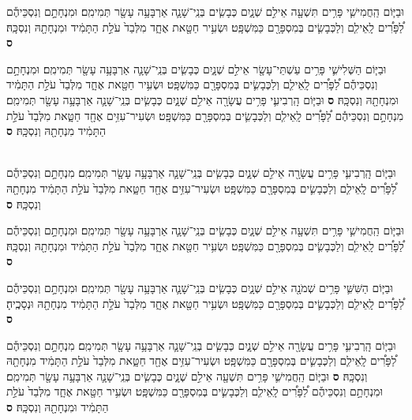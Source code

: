 \documentclass[twoside, openany, parskip=half, 11pt]{book}
\begin{document}
\begin{footnotesize}
\begin{multicols}{2}
וּבַיּ֧וֹם הַֽחֲמִישִׁ֛י פָּרִ֥ים תִּשְׁעָ֖ה אֵילִ֣ם שְׁנָ֑יִם כְּבָשִׂ֧ים בְּנֵֽי־שָׁנָ֛ה אַרְבָּעָ֥ה עָשָׂ֖ר תְּמִימִֽם׃ וּמִנְחָתָ֣ם וְנִסְכֵּיהֶ֡ם לַ֠פָּרִ֠ים לָֽאֵילִ֧ם וְלַכְּבָשִׂ֛ים בְּמִסְפָּרָ֖ם כַּמִּשְׁפָּֽט׃ וּשְׂעִ֥יר חַטָּ֖את אֶחָ֑ד מִלְּבַד֙ עֹלַ֣ת הַתָּמִ֔יד וּמִנְחָתָ֖הּ וְנִסְכָּֽהּ׃ \textbf{ס} 

וּבַיּ֧וֹם הַשְּׁלִישִׁ֛י פָּרִ֥ים עַשְׁתֵּי־עָשָׂ֖ר אֵילִ֣ם שְׁנָ֑יִם כְּבָשִׂ֧ים בְּנֵֽי־שָׁנָ֛ה אַרְבָּעָ֥ה עָשָׂ֖ר תְּמִימִֽם׃ וּמִנְחָתָ֣ם וְנִסְכֵּיהֶ֡ם לַ֠פָּרִ֠ים לָֽאֵילִ֧ם וְלַכְּבָשִׂ֛ים בְּמִסְפָּרָ֖ם כַּמִּשְׁפָּֽט׃ וּשְׂעִ֥יר חַטָּ֖את אֶחָ֑ד מִלְּבַד֙ עֹלַ֣ת הַתָּמִ֔יד וּמִנְחָתָ֖הּ וְנִסְכָּֽהּ׃ \textbf{ס} 
וּבַיּ֧וֹם הָֽרְבִיעִ֛י פָּרִ֥ים עֲשָׂרָ֖ה אֵילִ֣ם שְׁנָ֑יִם כְּבָשִׂ֧ים בְּנֵֽי־שָׁנָ֛ה אַרְבָּעָ֥ה עָשָׂ֖ר תְּמִימִֽם׃ מִנְחָתָ֣ם וְנִסְכֵּיהֶ֡ם לַ֠פָּרִ֠ים לָֽאֵילִ֧ם וְלַכְּבָשִׂ֛ים בְּמִסְפָּרָ֖ם כַּמִּשְׁפָּֽט׃ וּשְׂעִיר־עִזִּ֥ים אֶחָ֖ד חַטָּ֑את מִלְּבַד֙ עֹלַ֣ת הַתָּמִ֔יד מִנְחָתָ֖הּ וְנִסְכָּֽהּ׃ \textbf{ס} 

\\
וּבַיּ֧וֹם הָֽרְבִיעִ֛י פָּרִ֥ים עֲשָׂרָ֖ה אֵילִ֣ם שְׁנָ֑יִם כְּבָשִׂ֧ים בְּנֵֽי־שָׁנָ֛ה אַרְבָּעָ֥ה עָשָׂ֖ר תְּמִימִֽם׃ מִנְחָתָ֣ם וְנִסְכֵּיהֶ֡ם לַ֠פָּרִ֠ים לָֽאֵילִ֧ם וְלַכְּבָשִׂ֛ים בְּמִסְפָּרָ֖ם כַּמִּשְׁפָּֽט׃ וּשְׂעִיר־עִזִּ֥ים אֶחָ֖ד חַטָּ֑את מִלְּבַד֙ עֹלַ֣ת הַתָּמִ֔יד מִנְחָתָ֖הּ וְנִסְכָּֽהּ׃ \textbf{ס} 

וּבַיּ֧וֹם הַֽחֲמִישִׁ֛י פָּרִ֥ים תִּשְׁעָ֖ה אֵילִ֣ם שְׁנָ֑יִם כְּבָשִׂ֧ים בְּנֵֽי־שָׁנָ֛ה אַרְבָּעָ֥ה עָשָׂ֖ר תְּמִימִֽם׃ וּמִנְחָתָ֣ם וְנִסְכֵּיהֶ֡ם לַ֠פָּרִ֠ים לָֽאֵילִ֧ם וְלַכְּבָשִׂ֛ים בְּמִסְפָּרָ֖ם כַּמִּשְׁפָּֽט׃ וּשְׂעִ֥יר חַטָּ֖את אֶחָ֑ד מִלְּבַד֙ עֹלַ֣ת הַתָּמִ֔יד וּמִנְחָתָ֖הּ וְנִסְכָּֽהּ׃ \textbf{ס} 

וּבַיּ֧וֹם הַשִּׁשִּׁ֛י פָּרִ֥ים שְׁמֹנָ֖ה אֵילִ֣ם שְׁנָ֑יִם כְּבָשִׂ֧ים בְּנֵֽי־שָׁנָ֛ה אַרְבָּעָ֥ה עָשָׂ֖ר תְּמִימִֽם׃ וּמִנְחָתָ֣ם וְנִסְכֵּיהֶ֡ם לַ֠פָּרִ֠ים לָֽאֵילִ֧ם וְלַכְּבָשִׂ֛ים בְּמִסְפָּרָ֖ם כַּמִּשְׁפָּֽט׃ וּשְׂעִ֥יר חַטָּ֖את אֶחָ֑ד מִלְּבַד֙ עֹלַ֣ת הַתָּמִ֔יד מִנְחָתָ֖הּ וּנְסָכֶֽיהָ׃ \textbf{ס} 

וּבַיּ֧וֹם הָֽרְבִיעִ֛י פָּרִ֥ים עֲשָׂרָ֖ה אֵילִ֣ם שְׁנָ֑יִם כְּבָשִׂ֧ים בְּנֵֽי־שָׁנָ֛ה אַרְבָּעָ֥ה עָשָׂ֖ר תְּמִימִֽם׃ מִנְחָתָ֣ם וְנִסְכֵּיהֶ֡ם לַ֠פָּרִ֠ים לָֽאֵילִ֧ם וְלַכְּבָשִׂ֛ים בְּמִסְפָּרָ֖ם כַּמִּשְׁפָּֽט׃ וּשְׂעִיר־עִזִּ֥ים אֶחָ֖ד חַטָּ֑את מִלְּבַד֙ עֹלַ֣ת הַתָּמִ֔יד מִנְחָתָ֖הּ וְנִסְכָּֽהּ׃ \textbf{ס} 
וּבַיּ֧וֹם הַֽחֲמִישִׁ֛י פָּרִ֥ים תִּשְׁעָ֖ה אֵילִ֣ם שְׁנָ֑יִם כְּבָשִׂ֧ים בְּנֵֽי־שָׁנָ֛ה אַרְבָּעָ֥ה עָשָׂ֖ר תְּמִימִֽם׃ וּמִנְחָתָ֣ם וְנִסְכֵּיהֶ֡ם לַ֠פָּרִ֠ים לָֽאֵילִ֧ם וְלַכְּבָשִׂ֛ים בְּמִסְפָּרָ֖ם כַּמִּשְׁפָּֽט׃ וּשְׂעִ֥יר חַטָּ֖את אֶחָ֑ד מִלְּבַד֙ עֹלַ֣ת הַתָּמִ֔יד וּמִנְחָתָ֖הּ וְנִסְכָּֽהּ׃ \textbf{ס} 


\end{multicols}
\end{footnotesize}
\end{document}
